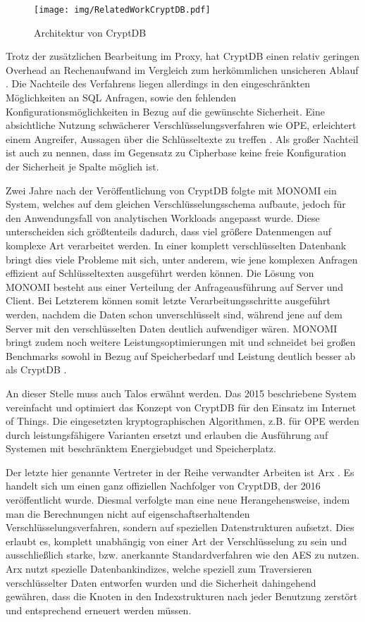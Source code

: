 \begin{figure}
	\texttt{[image: img/RelatedWorkCryptDB.pdf]}
	\centering
	\caption{Architektur von CryptDB}
	\label{fig:cryptdb}
\end{figure}

Trotz der zusätzlichen Bearbeitung im Proxy, hat CryptDB einen relativ geringen Overhead an Rechenaufwand im Vergleich zum herkömmlichen unsicheren Ablauf \cite{Popa2012}. Die Nachteile des Verfahrens liegen allerdings in den eingeschränkten Möglichkeiten an \ac{SQL} Anfragen, sowie den fehlenden Konfigurationsmöglichkeiten in Bezug auf die gewünschte Sicherheit. Eine absichtliche Nutzung schwächerer Verschlüsselungsverfahren wie \ac{OPE}, erleichtert einem Angreifer, Aussagen über die Schlüsseltexte zu treffen \cite{Poddar2016}. Als großer Nachteil ist auch zu nennen, dass im Gegensatz zu Cipherbase keine freie Konfiguration der Sicherheit je Spalte möglich ist.

Zwei Jahre nach der Veröffentlichung von CryptDB folgte mit MONOMI \cite{Tu2013} ein System, welches auf dem gleichen Verschlüsselungsschema aufbaute, jedoch für den Anwendungsfall von analytischen Workloads angepasst wurde. Diese unterscheiden sich größtenteils dadurch, dass viel größere Datenmengen auf komplexe Art verarbeitet werden. In einer komplett verschlüsselten Datenbank bringt dies viele Probleme mit sich, unter anderem, wie jene komplexen Anfragen effizient auf Schlüsseltexten ausgeführt werden können. Die Lösung von MONOMI besteht aus einer Verteilung der Anfrageausführung auf Server und Client. Bei Letzterem können somit letzte Verarbeitungsschritte ausgeführt werden, nachdem die Daten schon unverschlüsselt sind, während jene auf dem Server mit den verschlüsselten Daten deutlich aufwendiger wären. MONOMI bringt zudem noch weitere Leistungsoptimierungen mit und schneidet bei großen Benchmarks sowohl in Bezug auf Speicherbedarf und Leistung deutlich besser ab als CryptDB \cite{Tu2013}.

An dieser Stelle muss auch Talos \cite{Shafagh2015} erwähnt werden. Das 2015 beschriebene System vereinfacht und optimiert das Konzept von CryptDB für den Einsatz im Internet of Things. Die eingesetzten kryptographischen Algorithmen, z.B. für \ac{OPE} werden durch leistungsfähigere Varianten ersetzt und erlauben die Ausführung auf Systemen mit beschränktem Energiebudget und Speicherplatz.

Der letzte hier genannte Vertreter in der Reihe verwandter Arbeiten ist Arx \cite{Poddar2016}. Es handelt sich um einen ganz offiziellen Nachfolger von CryptDB, der 2016 veröffentlicht wurde. Diesmal verfolgte man eine neue Herangehensweise, indem man die Berechnungen nicht auf eigenschaftserhaltenden Verschlüsselungsverfahren, sondern auf speziellen Datenstrukturen aufsetzt. Dies erlaubt es, komplett unabhängig von einer Art der Verschlüsselung zu sein und ausschließlich starke, bzw. anerkannte Standardverfahren wie den \ac{AES} zu nutzen. Arx nutzt spezielle Datenbankindizes, welche speziell zum Traversieren verschlüsselter Daten entworfen wurden und die Sicherheit dahingehend gewähren, dass die Knoten in den Indexstrukturen nach jeder Benutzung zerstört und entsprechend erneuert werden müssen.


